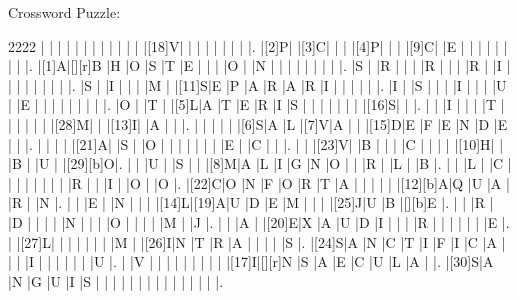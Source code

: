 \documentclass[12pt]{article}
\begin{document}
\begin{center}
  \huge{Crossword Puzzle:}
\end{center}
\vspace{1.5cm}
\begin{Puzzle}{22}{22}
  |{}  |{}  |{}  |{}  |{}  |{}  |{}  |{}  |{}  |{}  |{}  |{}  |[18]V|{}  |{}  |{}  |{}  |{}  |{}  |{}  |{}  |.
  |[2]P|{}  |[3]C|{}  |{}  |{}  |[4]P|{}  |{}  |{}  |[9]C|{}  |E   |{}  |{}  |{}  |{}  |{}  |{}  |{}  |{}  |.
	|[1]A|[][r]B   |H   |O   |S   |T   |E   |{}  |{}  |{}  |O   |{}  |N   |{}  |{}  |{}  |{}  |{}  |{}  |{}  |{}  |.
  |S   |{}  |R   |{}  |{}  |{}  |R   |{}  |{}  |{}  |R   |{}  |I   |{}  |{}  |{}  |{}  |{}  |{}  |{}  |{}  |.
  |S   |{}  |I   |{}  |{}  |{}  |M   |{}  |[11]S|E   |P   |A   |R   |A   |R   |I   |{}  |{}  |{}  |{}  |{}  |.
  |I   |{}  |S   |{}  |{}  |{}  |I   |{}  |{}  |{}  |U   |{}  |E   |{}  |{}  |{}  |{}  |{}  |{}  |{}  |{}  |.
  |O   |{}  |T   |{}  |[5]L|A   |T   |E   |R   |I   |S   |{}  |{}  |{}  |{}  |{}  |{}  |{}  |[16]S|{}  |{}  |.
  |{}  |{}  |I   |{}  |{}  |{}  |T   |{}  |{}  |{}  |{}  |{}  |{}  |[28]M|{}  |{}  |[13]I|{}  |A   |{}  |{}  |.
  |{}  |{}  |{}  |{}  |{}  |[6]S|A   |L   |[7]V|A   |{}  |{}  |[15]D|E   |F   |E   |N   |D   |E   |{}  |{}  |.
  |{}  |{}  |{}  |{}  |[21]A|{}  |S   |{}  |O   |{}  |{}  |{}  |{}  |{}  |{}  |{}  |E   |{}  |C   |{}  |{}  |.
	|{}  |{}  |[23]V|{}  |B   |{}  |{}  |{}  |C   |{}  |{}  |{}  |{}  |[10]H|{}  |{}  |B   |{}  |U   |{}  |[29][b]O|.
  |{}  |{}  |U   |{}  |S   |{}  |{}  |[8]M|A   |L   |I   |G   |N   |O   |{}  |{}  |R   |{}  |L   |{}  |B   |.
  |{}  |{}  |L   |{}  |C   |{}  |{}  |{}  |{}  |{}  |{}  |{}  |{}  |R   |{}  |{}  |I   |{}  |O   |{}  |O   |.
	|[22]C|O   |N   |F   |O   |R   |T   |A   |{}  |{}  |{}  |{}  |{}  |[12][b]A|Q   |U   |A   |{}  |R   |{}  |N   |.
	|{}  |{}  |E   |{}  |N   |{}  |{}  |{}  |[14]L|[19]A|U   |D   |E   |M   |{}  |{}  |{}  |[25]J|U   |B   |[][b]E   |.
  |{}  |{}  |R   |{}  |D   |{}  |{}  |{}  |{}  |N   |{}  |{}  |{}  |O   |{}  |{}  |{}  |{}  |M   |{}  |J   |.
  |{}  |{}  |A   |{}  |[20]E|X   |A   |U   |D   |I   |{}  |{}  |{}  |R   |{}  |{}  |{}  |{}  |{}  |{}  |E   |.
  |{}  |[27]L|{}  |{}  |{}  |{}  |{}  |{}  |{}  |M   |{}  |[26]I|N   |T   |R   |A   |{}  |{}  |{}  |{}  |S   |.
  |[24]S|A   |N   |C   |T   |I   |F   |I   |C   |A   |{}  |{}  |{}  |I   |{}  |{}  |{}  |{}  |{}  |{}  |U   |.
	|{}  |V   |{}  |{}  |{}  |{}  |{}  |{}  |{}  |{}  |{}  |[17]I|[][r]N   |S   |A   |E   |C   |U   |L   |A   |{}  |.
  |[30]S|A   |N   |G   |U   |I   |S   |{}  |{}  |{}  |{}  |{}  |{}  |{}  |{}  |{}  |{}  |{}  |{}  |{}  |{}  |.
\end{Puzzle}
\end{document}
